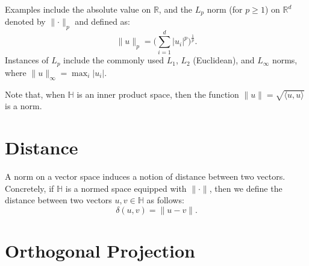 Examples include the absolute value on $\mathbb{R}$,
and the $L_p$ norm (for $p \geq 1$) on $\mathbb{R}^d$ denoted by $\lVert \cdot \rVert_p$
and defined as:
\begin{equation*}
    \lVert u \rVert_p = \Big( \sum_{i=1}^d \lvert u_i \rvert^p \Big)^{\frac{1}{p}}.
\end{equation*}
Instances of $L_p$ include the commonly used $L_1$, $L_2$ (Euclidean),
and $L_\infty$ norms, where $\lVert u \rVert_\infty = \max_i \lvert u_i \rvert$.

Note that, when $\mathbb{H}$ is an inner product space, then
the function $\lVert u \rVert = \sqrt{\langle u, u \rangle}$ is a norm.

\section{Distance}
A norm on a vector space induces a notion of distance between two vectors.
Concretely, if $\mathbb{H}$ is a normed space equipped with $\lVert \cdot \rVert$,
then we define the distance between two vectors $u, v \in \mathbb{H}$ as follows:
\begin{equation*}
    \delta(u, v) = \lVert u - v \rVert.
\end{equation*}

\section{Orthogonal Projection}

